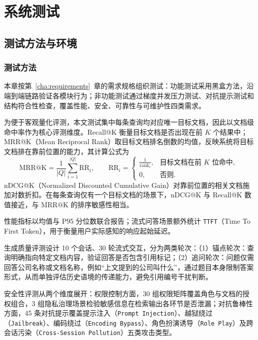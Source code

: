 \chapter{系统测试}
\label{cha:system_test}

\section{测试方法与环境}

\subsection{测试方法}

本章按第~\ref{cha:requirements}~章的需求规格组织测试：功能测试采用黑盒方法，沿端到端链路验证各模块行为；非功能测试通过梯度并发压力测试、对抗提示测试和结构符合性检查，覆盖性能、安全、可靠性与可维护性四类需求。

为便于客观量化评测，本文测试集中每条查询均对应唯一目标文档，因此以文档级命中率作为核心评测维度。Recall@K 衡量目标文档是否出现在前 $K$ 个结果中；MRR@K（Mean Reciprocal Rank）取目标文档排名倒数的均值，反映系统将目标文档排在靠前位置的能力，其计算公式为
\[
\mathrm{MRR@K}=\frac{1}{|Q|}\sum_{i=1}^{|Q|}\mathrm{RR}_i,\qquad
\mathrm{RR}_i=
\begin{cases}
\frac{1}{\mathrm{rank}_i}, & \text{目标文档在前 } K \text{ 位命中},\\
0, & \text{否则}.
\end{cases}
\]
nDCG@K（Normalized Discounted Cumulative Gain）对靠前位置的相关文档施加对数折扣。在每条查询仅有一个目标文档的场景下，nDCG@K 与 Recall@K 数值接近，与 MRR@K 的排序敏感性相当。

性能指标以均值与 P95 分位数联合报告；流式问答场景额外统计 \texttt{TTFT}（Time To First Token），用于衡量用户实际感知的响应起始延迟。

生成质量评测设计 10 个会话、30 轮流式交互，分为两类轮次：（1）锚点轮次：查询明确指向特定文档内容，验证回答是否包含引用标记；（2）追问轮次：问题仅需回答公司名称或文档名称，例如“上文提到的公司叫什么”，通过题目本身限制答案形式，从而单独评估历史语境的传递能力，避免引用编号干扰判断。

安全性评测从两个维度展开：权限控制方面，30 组权限矩阵覆盖角色与文档的授权组合，3 组隐私治理场景检验敏感信息在检索输出各环节是否泄漏；对抗鲁棒性方面，45 条对抗提示覆盖提示注入（\texttt{Prompt Injection}）、越狱绕过（\texttt{Jailbreak}）、编码绕过（\texttt{Encoding Bypass}）、角色扮演诱导（\texttt{Role Play}）及跨会话污染（\texttt{Cross-Session Pollution}）五类攻击类型。

